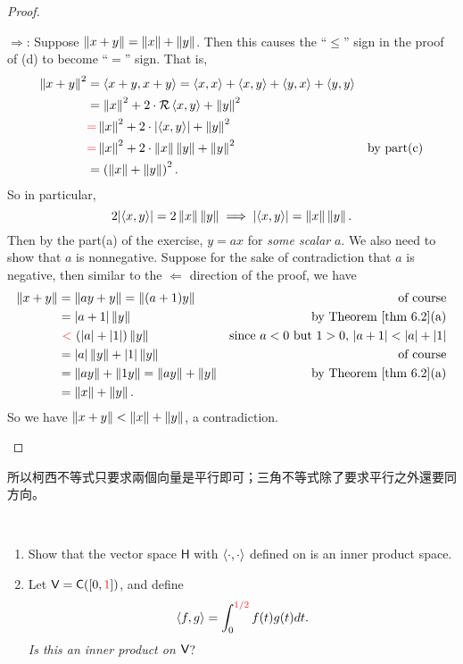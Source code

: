 \begin{proof}
\begin{enumerate}
\(\Longrightarrow\): Suppose \(\left\lVert x + y\right\rVert = \left\lVert x\right\rVert + \left\lVert y\right\rVert\).
Then this causes the ``\(\le\)'' sign in the proof of (d) to become ``\(=\)'' sign.
That is,
\begin{align*}
    \norm{x + y}^2 & = \LG x + y, x + y \RG = \LG x, x \RG + \LG x, y \RG + \LG y, x \RG + \LG y, y \RG \\
        & = \norm{x}^2 + 2 \cdot \mathcal{R}\LG x, y \RG + \norm{y}^2 \\
        & \RED{=} \norm{x}^2 + 2 \cdot \left| \LG x, y \RG \right| + \norm{y}^2 \\
        & \RED{=} \norm{x}^2 + 2 \cdot \norm{x} \norm{y} + \norm{y}^2 & \text{by part(c)} \\
        & = \left(\norm{x} + \norm{y}\right)^2.
\end{align*}
So in particular,
\[
    2 \lvert\left< x, y \right>\rvert = 2 \left\lVert x\right\rVert \left\lVert y\right\rVert \implies \lvert\left< x, y \right>\rvert = \left\lVert x\right\rVert \left\lVert y\right\rVert.
\]
Then by the part(a) of the exercise, \(y = ax\) for \emph{some scalar} \(a\).
We also need to show that \(a\) is nonnegative.
Suppose for the sake of contradiction that \(a\) is negative, then similar to the \(\Longleftarrow\) direction of the proof, we have
\begin{align*}
    \norm{x + y} & = \norm{ay + y} = \norm{(a + 1)y} & \text{of course} \\
        & = \abs{a + 1}\norm{y} & \text{by \THM{6.2}(a)} \\
        &\ \RED{<}\ (\abs{a} + \abs{1})\norm{y} & \text{since \(a < 0\) but \(1 > 0\), \(\abs{a + 1} < \abs{a} + \abs{1}\)} \\
        & = \abs{a}\norm{y} + \abs{1}\norm{y} & \text{of course} \\
        & = \norm{ay} + \norm{1y} = \norm{ay} + \norm{y} & \text{by \THM{6.2}(a)} \\
        & = \norm{x} + \norm{y}.
\end{align*}
So we have \(\left\lVert x + y\right\rVert < \left\lVert x\right\rVert + \left\lVert y\right\rVert\), a contradiction.
\end{enumerate}
\end{proof}

\begin{note}
所以柯西不等式只要求兩個向量是平行即可；三角不等式除了要求平行之外還要同方向。
\end{note}

\begin{exercise} \label{exercise 6.1.16} \ 

\begin{enumerate}
\item Show that the vector space \(\textsf{H}\) with \(\left< \cdot, \cdot \right>\) defined on  is an inner product space.
\item Let \(\V = \CONT([0, \RED{1}])\), and define
\[
    \LG f, g \RG = \int_0^{\RED{1/2}} f(t)g(t) dt.
\]
\emph{Is this an inner product on \(\textsf{V}\)}?
\end{enumerate}
\end{exercise}

